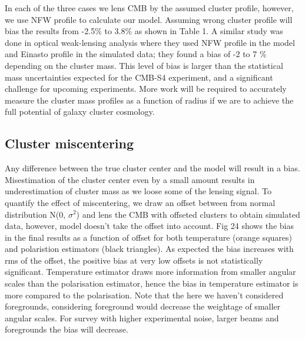  In each of the three cases we lens CMB by the assumed cluster profile, however, we use NFW profile to calculate our model.
 Assuming wrong cluster profile will bias the results from -2.5\% to 3.8\% as shown in Table 1. 
 A similar study was done in optical weak-lensing analysis where they used NFW profile in the model and Einasto profile in the simulated data; they found a bias of -2 to 7 \% depending on the cluster mass. This level of bias is larger than the statistical mass uncertainties expected for the CMB-S4 experiment, and a significant challenge for upcoming experiments.
More work will be required to accurately measure the cluster mass profiles as a function of radius if we are to achieve the full potential of galaxy cluster cosmology. 

\subsection{Cluster miscentering}

Any difference between the true cluster center and the model will result in a bias.
 Misestimation of the cluster center even by a small amount results in underestimation of cluster mass as we loose some of the lensing signal.
To quantify the effect of miscentering, we draw an offset between from normal distribution N(0, $\sigma^{2}$) and lens the CMB with offseted clusters to obtain simulated data, however, model doesn't take the offset into account.
Fig 24 shows the bias in the final results as a function of offset for both temperature (orange squares) and polaristion estimators (black triangles).
As expected the bias increases with rms of the offset, the positive bias at very low offsets is not statistically significant.
Temperature estimator draws more information from smaller angular scales than the polarisation estimator, hence the bias in temperature estimator is more compared to the polarisation. Note that the here we haven't considered foregrounds, considering foreground would decrease the weightage of smaller angular scales. For survey with higher experimental noise, larger beams and foregrounds the bias will decrease.

